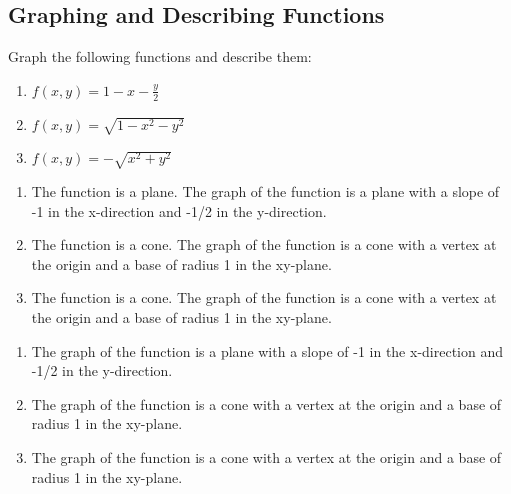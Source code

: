 \documentclass{article}
\begin{document}
\subsection*{Graphing and Describing Functions}
\begin{examplebox}
Graph the following functions and describe them:
\begin{enumerate}
    \item \( f(x, y) = 1 - x - \frac{y}{2} \)
    \item \( f(x, y) = \sqrt{1 - x^2 - y^2} \)
    \item \( f(x, y) = -\sqrt{x^2 + y^2} \)
\end{enumerate}
\begin{solutionbox}
\begin{enumerate}
    \item The function is a plane. The graph of the function is a plane with a slope of -1 in the x-direction and -1/2 in the y-direction.
    \item The function is a cone. The graph of the function is a cone with a vertex at the origin and a base of radius 1 in the xy-plane.
    \item The function is a cone. The graph of the function is a cone with a vertex at the origin and a base of radius 1 in the xy-plane.
\end{enumerate}
\begin{answerbox}
\begin{enumerate}
    \item The graph of the function is a plane with a slope of -1 in the x-direction and -1/2 in the y-direction.
    \item The graph of the function is a cone with a vertex at the origin and a base of radius 1 in the xy-plane.
    \item The graph of the function is a cone with a vertex at the origin and a base of radius 1 in the xy-plane.
    \end{enumerate}
\end{answerbox}
\end{solutionbox}
\end{examplebox}
\end{document}
